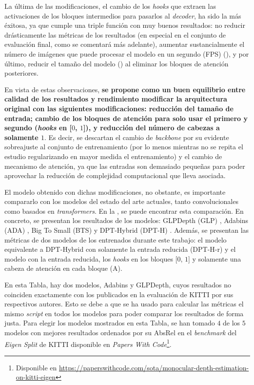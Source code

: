 La última de las modificaciones, el cambio de los \textit{hooks} que extraen las activaciones de los bloques intermedios para pasarlos al \textit{decoder}, ha sido la más éxitosa, ya que cumple una triple función con muy buenos resultados: no reducir drásticamente las métricas de los resultados (en especial en el conjunto de evaluación final, como se comentará más adelante), aumentar sustancialmente el número de imágenes que puede procesar el modelo en un segundo (FPS) (), y por último, reducir el tamaño del modelo () al eliminar los bloques de atención posteriores.

En vista de estas observaciones, \textbf{se propone como un buen equilibrio entre calidad de los resultados y rendimiento modificar la arquitectura original con las siguientes modificaciones: reducción del tamaño de entrada; cambio de los bloques de atención para solo usar el primero y segundo (\textit{hooks} en [$0$, $1$]), y reducción del número de cabezas a solamente $1$}. Es decir, se descartan el cambio de \textit{backbone} por su evidente sobreajuste al conjunto de entrenamiento (por lo menos mientras no se repita el estudio regularizando en mayor medida el entrenamiento) y el cambio de mecanismo de atención, ya que las entradas son demasiado pequeñas para poder aprovechar la reducción de complejidad computacional que lleva asociada.

El modelo obtenido con dichas modificaciones, no obstante, es importante compararlo con los modelos del estado del arte actuales, tanto convolucionales como basados en \textit{transformers}. En la , se puede encontrar esta comparación. En concreto, se presentan los resultados de los modelos: GLPDepth (GLP) \cite{glpdepth}, Adabins (ADA) \cite{bhat2020adabins}, Big To Small (BTS) \cite{bts} y DPT-Hybrid (DPT-H) \cite{visiontransformersDPT}. Además, se presentan las métricas de dos modelos de los entrenados durante este trabajo: el modelo equivalente a DPT-Hybrid con solamente la entrada reducida (DPT-H-r) y el modelo con la entrada reducida, los \textit{hooks} en los bloques [$0$, $1$] y solamente una cabeza de atención en cada bloque (A). 

En esta Tabla, hay dos modelos, Adabins y GLPDepth, cuyos resultados no coinciden exactamente con los publicados en la evaluación de KITTI por sus respectivos autores. Esto se debe a que se ha usado para calcular las métricas el mismo \textit{script} en todos los modelos para poder comparar los resultados de forma justa. Para elegir los modelos mostrados en esta Tabla, se han tomado $4$ de los $5$ modelos con mejores resultados ordenados por su AbsRel en el \textit{benchmark} del \textit{Eigen Split} de KITTI disponible en \textit{Papers With Code}\footnote{Disponible en \url{https://paperswithcode.com/sota/monocular-depth-estimation-on-kitti-eigen}}.

